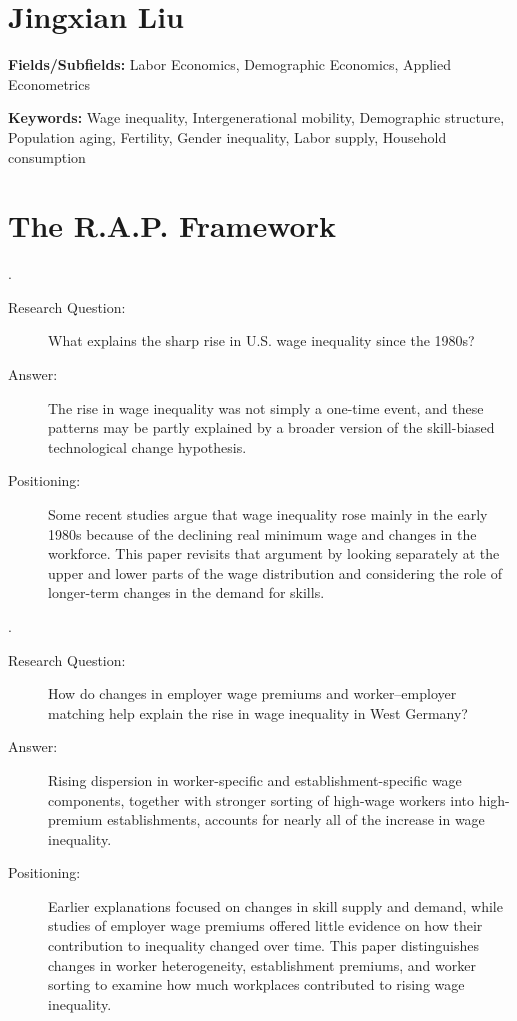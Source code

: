 \documentclass[12pt,a4paper]{article}
\begin{document}
\nobibliography*
\section*{Jingxian Liu}

\noindent\textbf{Fields/Subfields:} Labor Economics, Demographic Economics, Applied Econometrics

\medskip
\noindent\textbf{Keywords:} Wage inequality, Intergenerational mobility,
Demographic structure, Population aging, Fertility, Gender inequality,
Labor supply, Household consumption

\renewcommand{\refname}{Papers}
\nocite{autor2008,card2013,kleven2019,chetty2014,jaimovich2009}


\section*{The R.A.P. Framework}

\bigskip
\noindent{}.

\begin{description}
  \item[Research Question:] What explains the sharp rise in U.S. wage inequality since the 1980s?
  \item[Answer:] The rise in wage inequality was not simply a one-time event, and these patterns may be partly explained by a broader version of the skill-biased technological change hypothesis.
  \item[Positioning:] Some recent studies argue that wage inequality rose mainly in the early 1980s because of the declining real minimum wage and changes in the workforce. This paper revisits that argument by looking separately at the upper and lower parts of the wage distribution and considering the role of longer-term changes in the demand for skills.
\end{description}

\bigskip
\noindent{}.

\begin{description}
  \item[Research Question:] How do changes in employer wage premiums and worker–employer matching help explain the rise in wage inequality in West Germany?
  \item[Answer:] Rising dispersion in worker-specific and establishment-specific wage components, together with stronger sorting of high-wage workers into high-premium establishments, accounts for nearly all of the increase in wage inequality.
  \item[Positioning:] Earlier explanations focused on changes in skill supply and demand, while studies of employer wage premiums offered little evidence on how their contribution to inequality changed over time. This paper distinguishes changes in worker heterogeneity, establishment premiums, and worker sorting to examine how much workplaces contributed to rising wage inequality.
\end{description}
\end{document}

